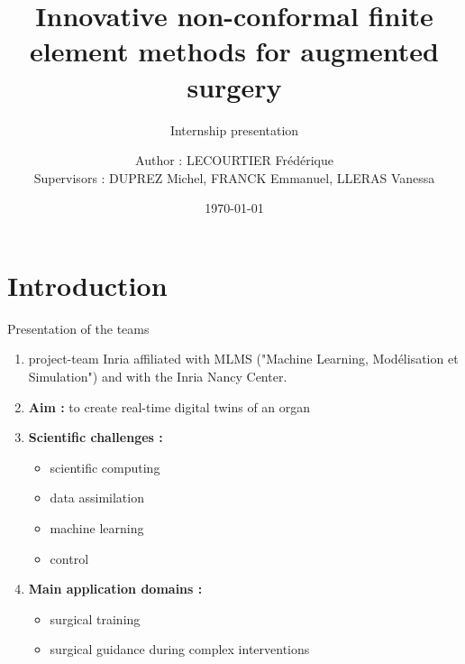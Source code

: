 \documentclass[compress,10pt,xcolor={table,dvipsnames},t]{beamer}
\title[PhiFEM]{Innovative non-conformal finite element methods for augmented surgery}
\subtitle{Internship presentation}
\author[name]{Author : LECOURTIER Frédérique \\ Supervisors : DUPREZ Michel, FRANCK Emmanuel, LLERAS Vanessa}
\institute{\large Strasbourg University}
\date{\today}
\begin{document}
	\nocite{*}
	
	\begin{frame}
		\vspace{-20pt}
		\titlepage
	\end{frame}
	
	\AtBeginSection[]{
		\begin{frame}
			\vfill
			\centering
			\begin{beamercolorbox}[sep=5pt,shadow=true,rounded=true]{subtitle}
				\usebeamerfont{title}\insertsectionhead\par%
			\end{beamercolorbox}
			\tableofcontents[sectionstyle=hide,subsectionstyle=show/shaded/hide]
			\vfill
		\end{frame}
	}


	\section{Introduction}

	\begin{frame}{Presentation of the teams}
		\begin{center}
		\end{center}
		\begin{enumerate}[\ding{217}]
			\item project-team Inria affiliated with MLMS ("Machine Learning, Modélisation et Simulation") and with the Inria Nancy Center.
			\item \textbf{Aim :} to create real-time digital twins of an organ
			\item \textbf{Scientific challenges :}
			\begin{itemize}
				\item scientific computing
				\item data assimilation
				\item machine learning
				\item control
			\end{itemize}
			\item \textbf{Main application domains :}
			\begin{itemize}
				\item surgical training
				\item surgical guidance during complex interventions
			\end{itemize}
		\end{enumerate}
	\end{frame}
\end{document}
